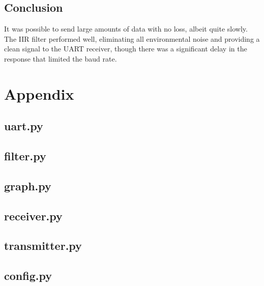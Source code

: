 \documentclass{article}
\begin{document}
\begin{multicols}{2}
\section{Conclusion}
It was possible to send large amounts of data with no loss, albeit quite slowly. The IIR filter performed well, eliminating all environmental noise and providing a clean signal to the UART receiver, though there was a significant delay in the response that limited the baud rate.



\end{multicols}
\pagebreak

\section{Appendix}

\subsection{uart.py}


\subsection{filter.py}


\subsection{graph.py}


\subsection{receiver.py}


\subsection{transmitter.py}


\subsection{config.py}

\end{document}
